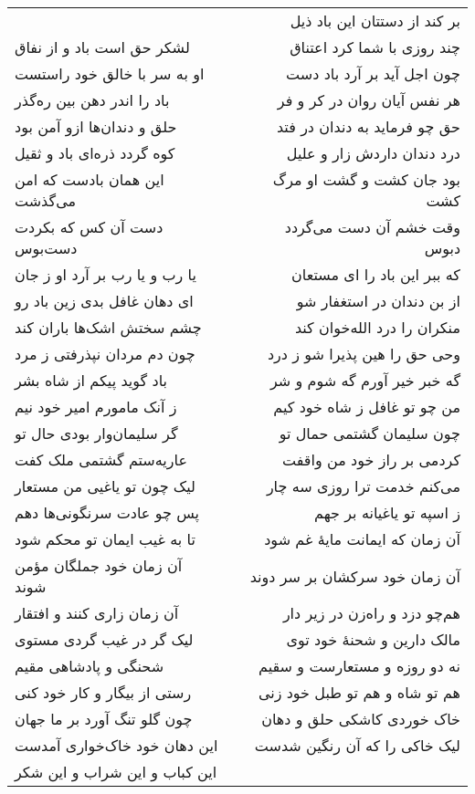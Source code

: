\begin{center}
\begin{longtable}{l p{0.5cm} r}
&&
بر کند از دستتان این باد ذیل
\\
لشکر حق است باد و از نفاق
&&
چند روزی با شما کرد اعتناق
\\
او به سر با خالق خود راستست
&&
چون اجل آید بر آرد باد دست
\\
باد را اندر دهن بین ره‌گذر
&&
هر نفس آیان روان در کر و فر
\\
حلق و دندان‌ها ازو آمن بود
&&
حق چو فرماید به دندان در فتد
\\
کوه گردد ذره‌ای باد و ثقیل
&&
درد دندان داردش زار و علیل
\\
این همان بادست که امن می‌گذشت
&&
بود جان کشت و گشت او مرگ کشت
\\
دست آن کس که بکردت دست‌بوس
&&
وقت خشم آن دست می‌گردد دبوس
\\
یا رب و یا رب بر آرد او ز جان
&&
که ببر این باد را ای مستعان
\\
ای دهان غافل بدی زین باد رو
&&
از بن دندان در استغفار شو
\\
چشم سختش اشک‌ها باران کند
&&
منکران را درد الله‌خوان کند
\\
چون دم مردان نپذرفتی ز مرد
&&
وحی حق را هین پذیرا شو ز درد
\\
باد گوید پیکم از شاه بشر
&&
گه خبر خیر آورم گه شوم و شر
\\
ز آنک مامورم امیر خود نیم
&&
من چو تو غافل ز شاه خود کیم
\\
گر سلیمان‌وار بودی حال تو
&&
چون سلیمان گشتمی حمال تو
\\
عاریه‌ستم گشتمی ملک کفت
&&
کردمی بر راز خود من واقفت
\\
لیک چون تو یاغیی من مستعار
&&
می‌کنم خدمت ترا روزی سه چار
\\
پس چو عادت سرنگونی‌ها دهم
&&
ز اسپه تو یاغیانه بر جهم
\\
تا به غیب ایمان تو محکم شود
&&
آن زمان که ایمانت مایهٔ غم شود
\\
آن زمان خود جملگان مؤمن شوند
&&
آن زمان خود سرکشان بر سر دوند
\\
آن زمان زاری کنند و افتقار
&&
هم‌چو دزد و راه‌زن در زیر دار
\\
لیک گر در غیب گردی مستوی
&&
مالک دارین و شحنهٔ خود توی
\\
شحنگی و پادشاهی مقیم
&&
نه دو روزه و مستعارست و سقیم
\\
رستی از بیگار و کار خود کنی
&&
هم تو شاه و هم تو طبل خود زنی
\\
چون گلو تنگ آورد بر ما جهان
&&
خاک خوردی کاشکی حلق و دهان
\\
این دهان خود خاک‌خواری آمدست
&&
لیک خاکی را که آن رنگین شدست
\\
این کباب و این شراب و این شکر

\end{longtable}
\end{center}
